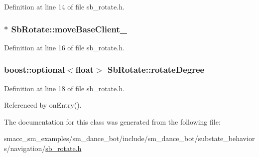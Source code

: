 Definition at line 14 of file sb\+\_\+rotate.\+h.

\subsubsection[{\texorpdfstring{move\+Base\+Client\+\_\+}{moveBaseClient_}}]{$\ast$ Sb\+Rotate\+::move\+Base\+Client\+\_\+}\hypertarget{classSbRotate_ab6cc0ea1c2e05c0e1ebd57ed6c7d6725}{}\label{classSbRotate_ab6cc0ea1c2e05c0e1ebd57ed6c7d6725}


Definition at line 16 of file sb\+\_\+rotate.\+h.

\subsubsection[{\texorpdfstring{rotate\+Degree}{rotateDegree}}]{\setlength{\rightskip}{0pt plus 5cm}boost\+::optional$<$float$>$ Sb\+Rotate\+::rotate\+Degree}\hypertarget{classSbRotate_aeaec32fdba434d9482548bda764b0fe0}{}\label{classSbRotate_aeaec32fdba434d9482548bda764b0fe0}


Definition at line 18 of file sb\+\_\+rotate.\+h.



Referenced by on\+Entry().



The documentation for this class was generated from the following file\+:\begin{DoxyCompactItemize}
\item 
smacc\+\_\+sm\+\_\+examples/sm\+\_\+dance\+\_\+bot/include/sm\+\_\+dance\+\_\+bot/substate\+\_\+behaviors/navigation/\hyperlink{sb__rotate_8h}{sb\+\_\+rotate.\+h}\end{DoxyCompactItemize}
